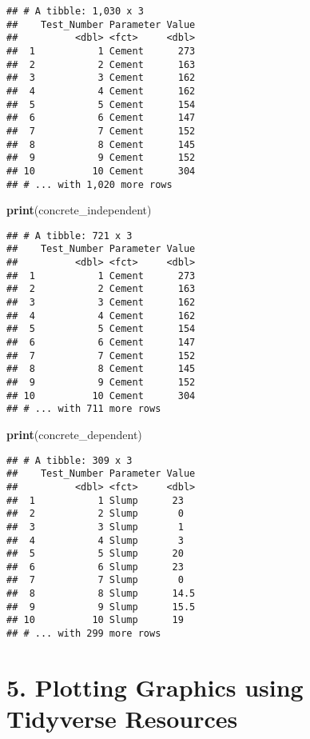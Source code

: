 \documentclass[]{article}
\newenvironment{Shaded}{\begin{snugshade}}{\end{snugshade}}
\newcommand{\KeywordTok}[1]{\textcolor[rgb]{0.13,0.29,0.53}{\textbf{#1}}}
\newcommand{\NormalTok}[1]{#1}
\begin{document}
\begin{verbatim}
## # A tibble: 1,030 x 3
##    Test_Number Parameter Value
##          <dbl> <fct>     <dbl>
##  1           1 Cement      273
##  2           2 Cement      163
##  3           3 Cement      162
##  4           4 Cement      162
##  5           5 Cement      154
##  6           6 Cement      147
##  7           7 Cement      152
##  8           8 Cement      145
##  9           9 Cement      152
## 10          10 Cement      304
## # ... with 1,020 more rows
\end{verbatim}

\begin{Shaded}
\begin{Highlighting}[]
  \KeywordTok{print}\NormalTok{(concrete_independent)}
\end{Highlighting}
\end{Shaded}

\begin{verbatim}
## # A tibble: 721 x 3
##    Test_Number Parameter Value
##          <dbl> <fct>     <dbl>
##  1           1 Cement      273
##  2           2 Cement      163
##  3           3 Cement      162
##  4           4 Cement      162
##  5           5 Cement      154
##  6           6 Cement      147
##  7           7 Cement      152
##  8           8 Cement      145
##  9           9 Cement      152
## 10          10 Cement      304
## # ... with 711 more rows
\end{verbatim}

\begin{Shaded}
\begin{Highlighting}[]
  \KeywordTok{print}\NormalTok{(concrete_dependent)}
\end{Highlighting}
\end{Shaded}

\begin{verbatim}
## # A tibble: 309 x 3
##    Test_Number Parameter Value
##          <dbl> <fct>     <dbl>
##  1           1 Slump      23  
##  2           2 Slump       0  
##  3           3 Slump       1  
##  4           4 Slump       3  
##  5           5 Slump      20  
##  6           6 Slump      23  
##  7           7 Slump       0  
##  8           8 Slump      14.5
##  9           9 Slump      15.5
## 10          10 Slump      19  
## # ... with 299 more rows
\end{verbatim}

\hypertarget{plotting-graphics-using-tidyverse-resources}{%
\section{5. Plotting Graphics using Tidyverse
Resources}\label{plotting-graphics-using-tidyverse-resources}}
\end{document}
